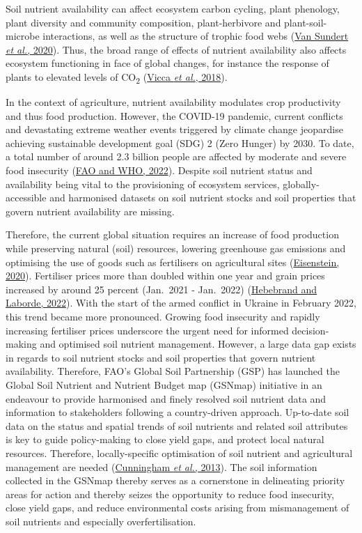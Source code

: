 \documentclass[
  10pt,
  b5paper,
  oneside]{book}
\begin{document}
Soil nutrient availability can affect ecosystem carbon cycling, plant phenology, plant diversity and community composition, plant-herbivore and plant-soil-microbe interactions, as well as the structure of trophic food webs (\protect\hyperlink{ref-vanSundert2020}{Van Sundert \emph{et al.}, 2020}). Thus, the broad range of effects of nutrient availability also affects ecosystem functioning in face of global changes, for instance the response of plants to elevated levels of CO\textsubscript{2} (\protect\hyperlink{ref-vicca2018}{Vicca \emph{et al.}, 2018}).

In the context of agriculture, nutrient availability modulates crop productivity and thus food production. However, the COVID-19 pandemic, current conflicts and devastating extreme weather events triggered by climate change jeopardise achieving sustainable development goal (SDG) 2 (Zero Hunger) by 2030. To date, a total number of around 2.3 billion people are affected by moderate and severe food insecurity (\protect\hyperlink{ref-FAO2022}{FAO and WHO, 2022}). Despite soil nutrient status and availability being vital to the provisioning of ecosystem services, globally-accessible and harmonised datasets on soil nutrient stocks and soil properties that govern nutrient availability are missing.

Therefore, the current global situation requires an increase of food production while preserving natural (soil) resources, lowering greenhouse gas emissions and optimising the use of goods such as fertilisers on agricultural sites (\protect\hyperlink{ref-eisenstein2020}{Eisenstein, 2020}). Fertiliser prices more than doubled within one year and grain prices increased by around 25 percent (Jan.~2021 - Jan.~2022) (\protect\hyperlink{ref-ifpri2020}{Hebebrand and Laborde, 2022}). With the start of the armed conflict in Ukraine in February 2022, this trend became more pronounced.
Growing food insecurity and rapidly increasing fertiliser prices underscore the urgent need for informed decision-making and optimised soil nutrient management. However, a large data gap exists in regards to soil nutrient stocks and soil properties that govern nutrient availability. Therefore, FAO's Global Soil Partnership (GSP) has launched the Global Soil Nutrient and Nutrient Budget map (GSNmap) initiative in an endeavour to provide harmonised and finely resolved soil nutrient data and information to stakeholders following a country-driven approach.
Up-to-date soil data on the status and spatial trends of soil nutrients and related soil attributes is key to guide policy-making to close yield gaps, and protect local natural resources. Therefore, locally-specific optimisation of soil nutrient and agricultural management are needed (\protect\hyperlink{ref-cunningham2013}{Cunningham \emph{et al.}, 2013}). The soil information collected in the GSNmap thereby serves as a cornerstone in delineating priority areas for action and thereby seizes the opportunity to reduce food insecurity, close yield gaps, and reduce environmental costs arising from mismanagement of soil nutrients and especially overfertilisation.
\end{document}

